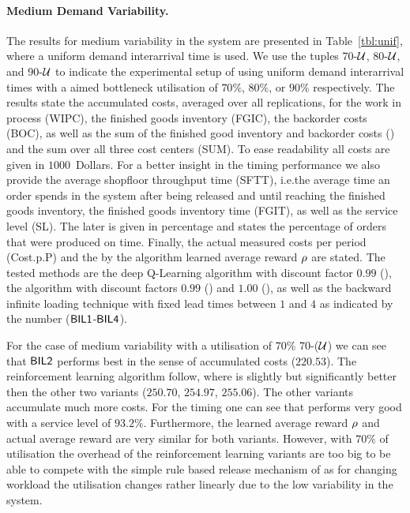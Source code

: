 \documentclass[envcountsame]{llncs}
\begin{document}
\begin{comment}
- Friedman chi-squared statistic: 96.150000
- p-value: 1.592809e-18
- rejection of the omnibus null hypothesis


\end{comment}


\paragraph{Medium Demand Variability.} The results for medium variability in the system are
presented in Table~\ref{tbl:unif}, where a uniform demand interarrival time is used. We use the
tuples 70-\(\mathcal{U}\), 80-\(\mathcal{U}\), and 90-\(\mathcal{U}\) to indicate the experimental setup of using
uniform demand interarrival times with a aimed bottleneck utilisation of \(70\%\), \(80\%\), or
\(90\%\) respectively. The results state the accumulated costs, averaged over all replications, for
the work in process (WIPC), the finished goods inventory (FGIC), the backorder costs (BOC), as well
as the sum of the finished good inventory and backorder costs (\fgibocName{}) and the sum over all
three cost centers (SUM). To ease readability all costs are given in \(1000\)~Dollars. For a better
insight in the timing performance we also provide the average shopfloor throughput time (SFTT),
i.e.\@ the average time an order spends in the system after being released and until reaching the
finished goods inventory, the finished goods inventory time (FGIT), as well as the service level
(SL). The later is given in percentage and states the percentage of orders that were produced on
time. Finally, the actual measured costs per period (Cost.p.P) and the by the algorithm learned
average reward \(\rho\) are stated. The tested methods are the deep Q-Learning algorithm with
discount factor \(0.99\) (), the \ARA{} algorithm with discount factors \(0.99\)
() and \(1.00\) (), as well as the backward infinite loading technique \BIL{}
with fixed lead times between \(1\) and \(4\) as indicated by the number ($\textsf{BIL1}$-$\textsf{BIL4}$).


For the case of medium variability with a utilisation of \(70\%\) 70-(\(\mathcal{U}\)) we can see that
\(\textsf{BIL2}\) performs best in the sense of accumulated costs (\(220.53\)). The reinforcement learning
algorithm follow, where  is slightly but significantly better then the other two variants
(\(250.70\), \(254.97\), \(255.06\)). The other \BIL{} variants accumulate much more costs. For the
timing one can see that  performs very good with a service level of \(93.2\%\).
Furthermore, the learned average reward \(\rho\) and actual average reward are very similar for
both \ARA{} variants. However, with \(70\%\) of utilisation the overhead of the reinforcement
learning variants are too big to be able to compete with the simple rule based release mechanism of
\BILTwo{} as for changing workload the utilisation changes rather linearly due to the low
variability in the system.
\end{document}

